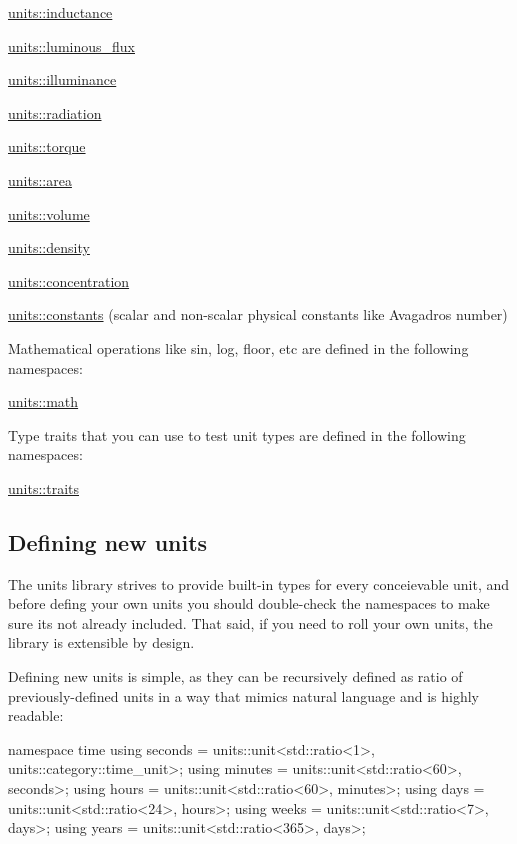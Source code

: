 \begin{DoxyItemize}
\item \hyperlink{namespaceunits_1_1inductance}{units\+::inductance}
\item \hyperlink{namespaceunits_1_1luminous__flux}{units\+::luminous\+\_\+flux}
\item \hyperlink{namespaceunits_1_1illuminance}{units\+::illuminance}
\item \hyperlink{namespaceunits_1_1radiation}{units\+::radiation}
\item \hyperlink{namespaceunits_1_1torque}{units\+::torque}
\item \hyperlink{namespaceunits_1_1area}{units\+::area}
\item \hyperlink{namespaceunits_1_1volume}{units\+::volume}
\item \hyperlink{namespaceunits_1_1density}{units\+::density}
\item \hyperlink{namespaceunits_1_1concentration}{units\+::concentration}
\item \hyperlink{namespaceunits_1_1constants}{units\+::constants} (scalar and non-\/scalar physical constants like Avagadro\textquotesingle{}s number)
\end{DoxyItemize}

Mathematical operations like {\ttfamily sin}, {\ttfamily log}, {\ttfamily floor}, etc are defined in the following namespaces\+:
\begin{DoxyItemize}
\item \hyperlink{namespaceunits_1_1math}{units\+::math}
\end{DoxyItemize}

Type traits that you can use to test unit types are defined in the following namespaces\+:
\begin{DoxyItemize}
\item \hyperlink{namespaceunits_1_1traits}{units\+::traits}
\end{DoxyItemize}

\subsection*{Defining new units }

The units library strives to provide built-\/in types for every conceievable unit, and before defing your own units you should double-\/check the namespaces to make sure it\textquotesingle{}s not already included. That said, if you need to roll your own units, the library is extensible by design.

Defining new units is simple, as they can be recursively defined as ratio of previously-\/defined units in a way that mimics natural language and is highly readable\+: \begin{DoxyVerb}namespace time
{
    using seconds = units::unit<std::ratio<1>,   units::category::time_unit>;
    using minutes = units::unit<std::ratio<60>,  seconds>;
    using hours   = units::unit<std::ratio<60>,  minutes>;
    using days    = units::unit<std::ratio<24>,  hours>;
    using weeks   = units::unit<std::ratio<7>,   days>;
    using years   = units::unit<std::ratio<365>, days>;
}
\end{DoxyVerb}


